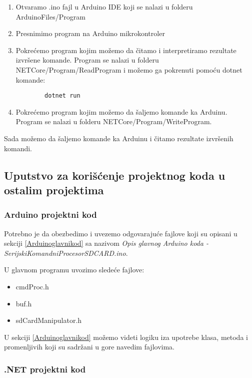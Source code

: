 \documentclass[a4paper]{extarticle}
\begin{document}
\begin{enumerate}
	\item Otvaramo .ino fajl u Arduino IDE koji se nalazi u folderu ArduinoFiles/Program
	\item Presnimimo program na Arduino mikrokontroler
	\item Pokrećemo program kojim možemo da čitamo i interpretiramo rezultate izvršene komande. Program se nalazi u folderu NETCore/Program/ReadProgram i možemo ga pokrenuti pomoću dotnet komande:
	\begin{small}
		\begin{verbatim}
		dotnet run
		\end{verbatim}
	\end{small} 
	\item Pokrećemo program kojim možemo da šaljemo komande ka Arduinu. Program se nalazi u folderu NETCore/Program/WriteProgram.
\end{enumerate}

Sada možemo da šaljemo komande ka Arduinu i čitamo rezultate izvršenih komandi.

\subsection{Uputstvo za korišćenje projektnog koda u ostalim projektima}
\subsubsection{Arduino projektni kod}

Potrebno je da obezbedimo i uvezemo odgovarajuće fajlove koji su opisani u sekciji \ref{Arduinoglavnikod} sa nazivom \textit{Opis glavnog Arduino koda - SerijskiKomandniProcesorSDCARD.ino}.

U glavnom programu uvozimo sledeće fajlove:
\begin{itemize}
	\item cmdProc.h
	\item buf.h
	\item sdCardManipulator.h
\end{itemize}

U sekciji \ref{Arduinoglavnikod} možemo videti logiku iza upotrebe klasa, metoda i promenljivih koji su sadržani u gore navedim fajlovima.


\subsubsection{.NET projektni kod}
\end{document}
